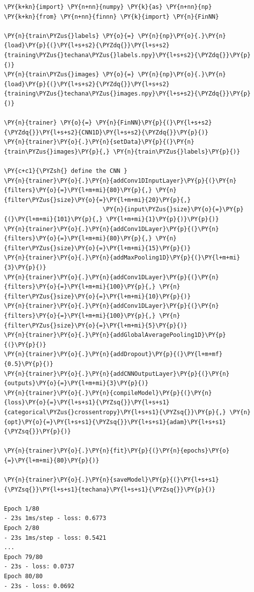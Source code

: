 \begin{tcolorbox}[breakable, size=fbox, boxrule=1pt, pad at break*=1mm,colback=cellbackground, colframe=cellborder]
\begin{Verbatim}[commandchars=\\\{\}]
\PY{k+kn}{import} \PY{n+nn}{numpy} \PY{k}{as} \PY{n+nn}{np}
\PY{k+kn}{from} \PY{n+nn}{finnn} \PY{k}{import} \PY{n}{FinNN}
	
\PY{n}{train\PYZus{}labels} \PY{o}{=} \PY{n}{np}\PY{o}{.}\PY{n}{load}\PY{p}{(}\PY{l+s+s2}{\PYZdq{}}\PY{l+s+s2}{training\PYZus{}techana\PYZus{}labels.npy}\PY{l+s+s2}{\PYZdq{}}\PY{p}{)}
\PY{n}{train\PYZus{}images} \PY{o}{=} \PY{n}{np}\PY{o}{.}\PY{n}{load}\PY{p}{(}\PY{l+s+s2}{\PYZdq{}}\PY{l+s+s2}{training\PYZus{}techana\PYZus{}images.npy}\PY{l+s+s2}{\PYZdq{}}\PY{p}{)}
	
\PY{n}{trainer} \PY{o}{=} \PY{n}{FinNN}\PY{p}{(}\PY{l+s+s2}{\PYZdq{}}\PY{l+s+s2}{CNN1D}\PY{l+s+s2}{\PYZdq{}}\PY{p}{)}
\PY{n}{trainer}\PY{o}{.}\PY{n}{setData}\PY{p}{(}\PY{n}{train\PYZus{}images}\PY{p}{,} \PY{n}{train\PYZus{}labels}\PY{p}{)}
	
\PY{c+c1}{\PYZsh{} define the CNN }
\PY{n}{trainer}\PY{o}{.}\PY{n}{addConv1DInputLayer}\PY{p}{(}\PY{n}{filters}\PY{o}{=}\PY{l+m+mi}{80}\PY{p}{,} \PY{n}{filter\PYZus{}size}\PY{o}{=}\PY{l+m+mi}{20}\PY{p}{,} 
                            \PY{n}{input\PYZus{}size}\PY{o}{=}\PY{p}{(}\PY{l+m+mi}{101}\PY{p}{,} \PY{l+m+mi}{1}\PY{p}{)}\PY{p}{)}
\PY{n}{trainer}\PY{o}{.}\PY{n}{addConv1DLayer}\PY{p}{(}\PY{n}{filters}\PY{o}{=}\PY{l+m+mi}{80}\PY{p}{,} \PY{n}{filter\PYZus{}size}\PY{o}{=}\PY{l+m+mi}{15}\PY{p}{)}
\PY{n}{trainer}\PY{o}{.}\PY{n}{addMaxPooling1D}\PY{p}{(}\PY{l+m+mi}{3}\PY{p}{)}
\PY{n}{trainer}\PY{o}{.}\PY{n}{addConv1DLayer}\PY{p}{(}\PY{n}{filters}\PY{o}{=}\PY{l+m+mi}{100}\PY{p}{,} \PY{n}{filter\PYZus{}size}\PY{o}{=}\PY{l+m+mi}{10}\PY{p}{)}
\PY{n}{trainer}\PY{o}{.}\PY{n}{addConv1DLayer}\PY{p}{(}\PY{n}{filters}\PY{o}{=}\PY{l+m+mi}{100}\PY{p}{,} \PY{n}{filter\PYZus{}size}\PY{o}{=}\PY{l+m+mi}{5}\PY{p}{)}
\PY{n}{trainer}\PY{o}{.}\PY{n}{addGlobalAveragePooling1D}\PY{p}{(}\PY{p}{)}
\PY{n}{trainer}\PY{o}{.}\PY{n}{addDropout}\PY{p}{(}\PY{l+m+mf}{0.5}\PY{p}{)}
\PY{n}{trainer}\PY{o}{.}\PY{n}{addCNNOutputLayer}\PY{p}{(}\PY{n}{outputs}\PY{o}{=}\PY{l+m+mi}{3}\PY{p}{)}
\PY{n}{trainer}\PY{o}{.}\PY{n}{compileModel}\PY{p}{(}\PY{n}{loss}\PY{o}{=}\PY{l+s+s1}{\PYZsq{}}\PY{l+s+s1}{categorical\PYZus{}crossentropy}\PY{l+s+s1}{\PYZsq{}}\PY{p}{,} \PY{n}{opt}\PY{o}{=}\PY{l+s+s1}{\PYZsq{}}\PY{l+s+s1}{adam}\PY{l+s+s1}{\PYZsq{}}\PY{p}{)}
	
\PY{n}{trainer}\PY{o}{.}\PY{n}{fit}\PY{p}{(}\PY{n}{epochs}\PY{o}{=}\PY{l+m+mi}{80}\PY{p}{)}
	
\PY{n}{trainer}\PY{o}{.}\PY{n}{saveModel}\PY{p}{(}\PY{l+s+s1}{\PYZsq{}}\PY{l+s+s1}{techana}\PY{l+s+s1}{\PYZsq{}}\PY{p}{)}

Epoch 1/80
- 23s 1ms/step - loss: 0.6773
Epoch 2/80
- 23s 1ms/step - loss: 0.5421
...
Epoch 79/80
- 23s - loss: 0.0737
Epoch 80/80
- 23s - loss: 0.0692
\end{Verbatim}
\end{tcolorbox}

